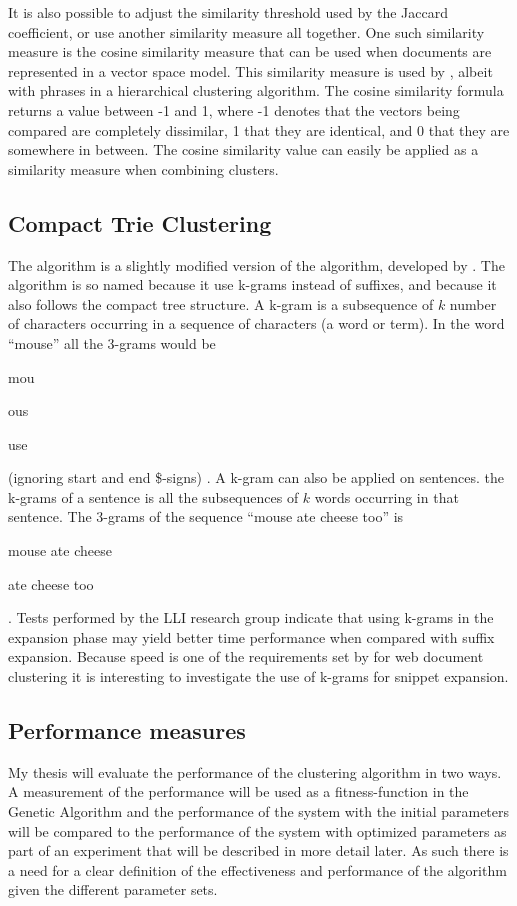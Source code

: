 It is also possible to adjust the similarity threshold used by the Jaccard coefficient, or use another similarity measure all together. One such similarity measure is the cosine similarity measure that can be used when documents are represented in a vector space model. This similarity measure is used by \cite{Chim2007}, albeit with phrases in a hierarchical clustering algorithm. The cosine similarity formula returns a value between -1 and 1, where -1 denotes that the vectors being compared are completely dissimilar, 1 that they are identical, and 0 that they are somewhere in between. The cosine similarity value can easily be applied as a similarity measure when combining clusters.

\subsection{Compact Trie Clustering}
The \CTC algorithm is a slightly modified version of the \STC algorithm, developed by \supervisor. The algorithm is so named because it use k-grams instead of suffixes, and because it also follows the compact tree structure. A k-gram is a subsequence of \(k\) number of characters occurring in a sequence of characters (a word or term). In the word ``mouse'' all the 3-grams would be 
\begin{inparaenum}[(1)] 
    \item mou
    \item ous
    \item use
\end{inparaenum}
(ignoring start and end \$-signs)
\cite{Manning2009}. A k-gram can also be applied on sentences. the k-grams of a sentence is all the subsequences of \(k\) words occurring in that sentence. The 3-grams of the sequence ``mouse ate cheese too'' is
\begin{inparaenum}[(1)] 
    \item mouse ate cheese
    \item ate cheese too
\end{inparaenum}.
Tests performed by the LLI research group indicate that using k-grams in the expansion phase may yield better time performance when compared with suffix expansion. Because speed is one of the requirements set by \cite{Oren1998} for web document clustering it is interesting to investigate the use of k-grams for snippet expansion.

\subsection{Performance measures}
My thesis will evaluate the performance of the clustering algorithm in two ways. A measurement of the performance will be used as a fitness-function in the Genetic Algorithm and the performance of the system with the initial parameters will be compared to the performance of the system with optimized parameters as part of an experiment that will be described in more detail later. As such there is a need for a clear definition of the effectiveness and performance of the \CTC algorithm given the different parameter sets.

